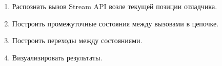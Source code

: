 \begin{frame}
\frametitle{\insertsection} 
\framesubtitle{\insertsubsection}
\begin{enumerate}
	\item Распознать вызов Stream API возле текущей позиции отладчика.
	\item Построить промежуточные состояния между вызовами в цепочке.
	\item Построить переходы между состояниями.
	\item Визуализировать результаты.
\end{enumerate}
\end{frame}
